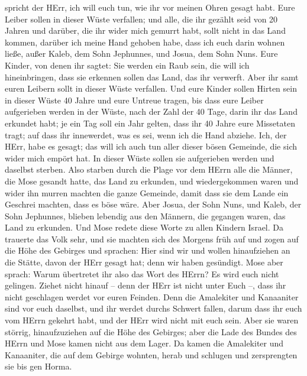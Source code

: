 spricht der HErr, ich will euch tun, wie ihr vor meinen Ohren gesagt
habt.  Eure Leiber sollen in dieser Wüste verfallen; und
alle, die ihr gezählt seid von 20 Jahren und darüber, die ihr wider mich
gemurrt habt,  sollt nicht in das Land kommen, darüber ich
meine Hand gehoben habe, dass ich euch darin wohnen ließe, außer Kaleb,
dem Sohn Jephunnes, und Josua, dem Sohn Nuns.  Eure Kinder,
von denen ihr sagtet: Sie werden ein Raub sein, die will ich
hineinbringen, dass sie erkennen sollen das Land, das ihr verwerft.
 Aber ihr samt euren Leibern sollt in dieser Wüste
verfallen.  Und eure Kinder sollen Hirten sein in dieser
Wüste 40 Jahre und eure Untreue tragen, bis dass eure Leiber aufgerieben
werden in der Wüste,  nach der Zahl der 40 Tage, darin ihr
das Land erkundet habt; je ein Tag soll ein Jahr gelten, dass ihr 40
Jahre eure Missetaten tragt; auf dass ihr innewerdet, was es sei, wenn
ich die Hand abziehe.  Ich, der HErr, habe es gesagt; das
will ich auch tun aller dieser bösen Gemeinde, die sich wider mich
empört hat. In dieser Wüste sollen sie aufgerieben werden und daselbst
sterben.  Also starben durch die Plage vor dem HErrn alle
die Männer, die Mose gesandt hatte, das Land zu erkunden, und
wiedergekommen waren und wider ihn murren machten die ganze Gemeinde,
 damit dass sie dem Lande ein Geschrei machten, dass es
böse wäre.  Aber Josua, der Sohn Nuns, und Kaleb, der Sohn
Jephunnes, blieben lebendig aus den Männern, die gegangen waren, das
Land zu erkunden.  Und Mose redete diese Worte zu allen
Kindern Israel. Da trauerte das Volk sehr,  und sie machten
sich des Morgens früh auf und zogen auf die Höhe des Gebirges und
sprachen: Hier sind wir und wollen hinaufziehen an die Stätte, davon der
HErr gesagt hat; denn wir haben gesündigt.  Mose aber
sprach: Warum übertretet ihr also das Wort des HErrn? Es wird euch nicht
gelingen.  Ziehet nicht hinauf -- denn der HErr ist nicht
unter Euch --, dass ihr nicht geschlagen werdet vor euren Feinden.
 Denn die Amalekiter und Kanaaniter sind vor euch daselbst,
und ihr werdet durchs Schwert fallen, darum dass ihr euch vom HErrn
gekehrt habt, und der HErr wird nicht mit euch sein.  Aber
sie waren störrig, hinaufzuziehen auf die Höhe des Gebirges; aber die
Lade des Bundes des HErrn und Mose kamen nicht aus dem Lager.
 Da kamen die Amalekiter und Kanaaniter, die auf dem
Gebirge wohnten, herab und schlugen und zersprengten sie bis gen Horma.
